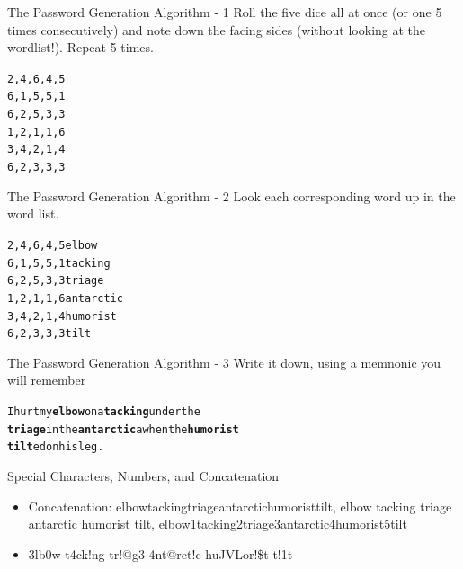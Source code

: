\documentclass{beamer}
\begin{document}
\begin{frame}{The Password Generation Algorithm - 1}
    Roll the five dice all at once (or one 5 times consecutively) and note down the facing sides (without looking at the wordlist!). Repeat 5 times.
    \begin{alltt}
2, 4, 6, 4, 5\\
6, 1, 5, 5, 1\\
6, 2, 5, 3, 3\\
1, 2, 1, 1, 6\\
3, 4, 2, 1, 4\\
6, 2, 3, 3, 3
    \end{alltt}
\end{frame}

\begin{frame}{The Password Generation Algorithm - 2}
    Look each corresponding word up in the word list.
    \begin{alltt}
2, 4, 6, 4, 5 elbow\\
6, 1, 5, 5, 1 tacking\\
6, 2, 5, 3, 3 triage\\
1, 2, 1, 1, 6 antarctic\\
3, 4, 2, 1, 4 humorist\\
6, 2, 3, 3, 3 tilt
    \end{alltt}
\end{frame}

\begin{frame}{The Password Generation Algorithm - 3}
    Write it down, using a memnonic you will remember
    \begin{alltt}
I hurt my \textbf{elbow} on a \textbf{tacking} under the \\
\textbf{triage} in the \textbf{antarctic}a when the \textbf{humorist} \\
\textbf{tilt}ed on his leg.
    \end{alltt}
\end{frame}

\begin{frame}{Special Characters, Numbers, and Concatenation}
    \begin{itemize}
        \item Concatenation: elbowtackingtriageantarctichumoristtilt, elbow tacking triage antarctic humorist tilt, elbow1tacking2triage3antarctic4humorist5tilt
        \item 3lb0w t4ck!ng tr!@g3 4nt@rct!c huJVLor!\$t t!1t
    \end{itemize}
\end{frame}
\end{document}
